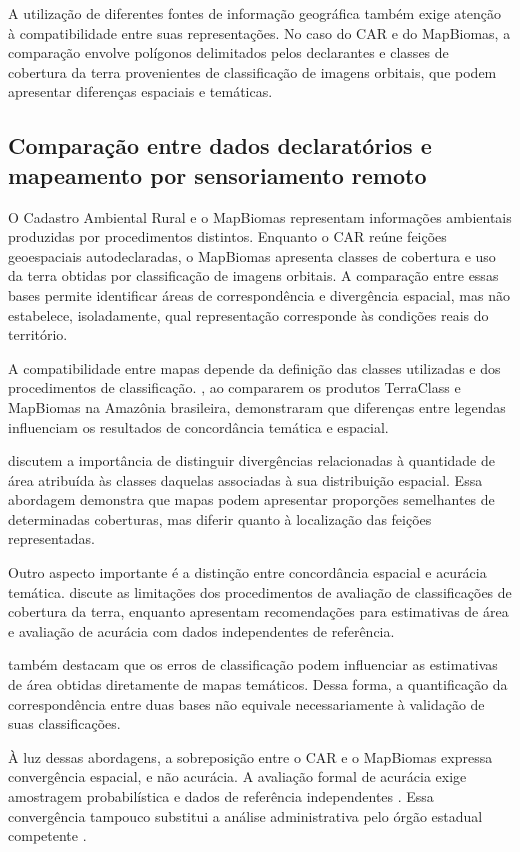 A utilização de diferentes fontes de informação geográfica também exige atenção à compatibilidade entre suas representações. No caso do CAR e do MapBiomas, a comparação envolve polígonos delimitados pelos declarantes e classes de cobertura da terra provenientes de classificação de imagens orbitais, que podem apresentar diferenças espaciais e temáticas.



\subsection{Comparação entre dados declaratórios e mapeamento por sensoriamento remoto}

O Cadastro Ambiental Rural e o MapBiomas representam informações ambientais produzidas por procedimentos distintos. Enquanto o CAR reúne feições geoespaciais autodeclaradas, o MapBiomas apresenta classes de cobertura e uso da terra obtidas por classificação de imagens orbitais. A comparação entre essas bases permite identificar áreas de correspondência e divergência espacial, mas não estabelece, isoladamente, qual representação corresponde às condições reais do território.

A compatibilidade entre mapas depende da definição das classes utilizadas e dos procedimentos de classificação. , ao compararem os produtos TerraClass e MapBiomas na Amazônia brasileira, demonstraram que diferenças entre legendas influenciam os resultados de concordância temática e espacial.

 discutem a importância de distinguir divergências relacionadas à quantidade de área atribuída às classes daquelas associadas à sua distribuição espacial. Essa abordagem demonstra que mapas podem apresentar proporções semelhantes de determinadas coberturas, mas diferir quanto à localização das feições representadas.

Outro aspecto importante é a distinção entre concordância espacial e acurácia temática.  discute as limitações dos procedimentos de avaliação de classificações de cobertura da terra, enquanto  apresentam recomendações para estimativas de área e avaliação de acurácia com dados independentes de referência.

 também destacam que os erros de classificação podem influenciar as estimativas de área obtidas diretamente de mapas temáticos. Dessa forma, a quantificação da correspondência entre duas bases não equivale necessariamente à validação de suas classificações.

À luz dessas abordagens, a sobreposição entre o CAR e o MapBiomas expressa convergência espacial, e não acurácia. A avaliação formal de acurácia exige amostragem probabilística e dados de referência independentes \cite{olofsson2014}. Essa convergência tampouco substitui a análise administrativa pelo órgão estadual competente \cite{car2026}.


\newpage
